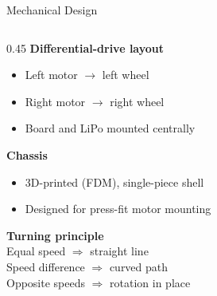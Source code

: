 \documentclass[aspectratio=169, 11pt]{beamer}
\begin{document}


\begin{frame}{Mechanical Design}

  \begin{columns}[T]
    \begin{column}{0.45\textwidth}
      \textbf{Differential-drive layout}
      \begin{itemize}
        \item Left motor $\rightarrow$ left wheel
        \item Right motor $\rightarrow$ right wheel
        \item Board and LiPo mounted centrally
      \end{itemize}

      \bigskip
      \textbf{Chassis}
      \begin{itemize}
        \item 3D-printed (FDM), single-piece shell
        \item Designed for press-fit motor mounting
      \end{itemize}

      \bigskip
      \textbf{Turning principle}\\[4pt]
      {\small
        Equal speed $\Rightarrow$ straight line\\
        Speed difference $\Rightarrow$ curved path\\
        Opposite speeds $\Rightarrow$ rotation in place
      }
    \end{column}


\end{columns}
\end{frame}
\end{document}
